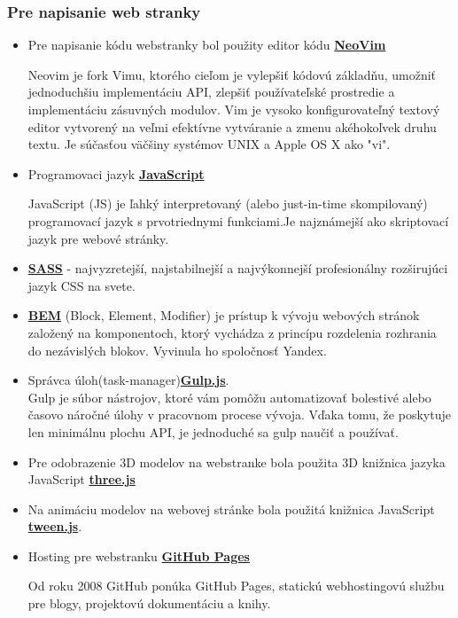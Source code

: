       \subsubsection{Pre napisanie web stranky}
        \begin{itemize}
          \item{
            Pre napisanie kódu webstranky bol použity editor kódu \textbf{\href{https://neovim.io/}{NeoVim}}

            Neovim je fork Vimu, ktorého cieľom je vylepšiť kódovú základňu, umožniť jednoduchšiu implementáciu API, zlepšiť používateľské prostredie a implementáciu zásuvných modulov.
            Vim je vysoko konfigurovateľný textový editor vytvorený na veľmi efektívne vytváranie a zmenu akéhokoľvek druhu textu. Je súčasťou väčšiny systémov UNIX a Apple OS X ako "vi".
          }
          \item{
            Programovaci jazyk \textbf{\href{https://developer.mozilla.org/en-US/docs/Web/JavaScript}{JavaScript}}

            JavaScript (JS) je ľahký interpretovaný (alebo just-in-time skompilovaný) programovací jazyk s prvotriednymi funkciami.Je najznámejší ako skriptovací jazyk pre webové stránky.
          }
          \item{
            \textbf{\href{https://sass-lang.com/}{SASS}} - najvyzretejší, najstabilnejší a najvýkonnejší profesionálny rozširujúci jazyk CSS na svete.
          }
          \item{
            \textbf{\href{https://yandex.ru/dev/bem/}{BEM}} (Block, Element, Modifier) je prístup k vývoju webových stránok založený na komponentoch, ktorý vychádza z princípu rozdelenia rozhrania do nezávislých blokov. Vyvinula ho spoločnosť Yandex.
          }
          \item{
            Správca úloh(task-manager)\textbf{\href{https://gulpjs.com/}{Gulp.js}}.\\
            Gulp je súbor nástrojov, ktoré vám pomôžu automatizovať bolestivé alebo časovo náročné úlohy v pracovnom procese vývoja. Vďaka tomu, že poskytuje len minimálnu plochu API, je jednoduché sa gulp naučiť a používať.
          }
          \item{
            Pre odobrazenie 3D modelov na webstranke bola použita 3D knižnica jazyka JavaScript \textbf{\href{https://github.com/mrdoob/three.js/}{three.js}}
          }
          \item{
            Na animáciu modelov na webovej stránke bola použitá knižnica JavaScript \textbf{\href{https://tweenjs.github.io/tween.js/}{tween.js}}.
          }
          \item{
            Hosting pre webstranku \textbf{\href{https://pages.github.com/}{GitHub Pages}} 

            Od roku 2008 GitHub ponúka GitHub Pages, statickú webhostingovú službu pre blogy, projektovú dokumentáciu a knihy.
          }
        \end{itemize}

